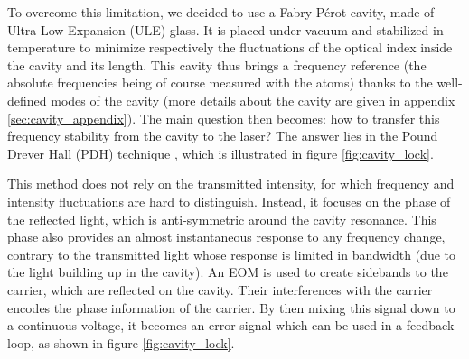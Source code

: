 \documentclass[11pt]{article}
\numberwithin{equation}{section}
\numberwithin{figure}{section}
\begin{document}
To overcome this limitation, we decided to use a Fabry-Pérot cavity, made of Ultra Low Expansion (ULE) glass. It is placed under vacuum and stabilized in temperature to minimize respectively the fluctuations of the optical index inside the cavity and its length. This cavity thus brings a frequency reference (the absolute frequencies being of course measured with the atoms) thanks to the well-defined modes of the cavity (more details about the cavity are given in appendix \ref{sec:cavity_appendix}). The main question then becomes: how to transfer this frequency stability from the cavity to the laser? The answer lies in the Pound Drever Hall (PDH) technique \citep[see for instance][]{2001_black}, which is illustrated in figure \ref{fig:cavity_lock}.  

This method does not rely on the transmitted intensity, for which frequency and intensity fluctuations are hard to distinguish. Instead, it focuses on the phase of the reflected light, which is anti-symmetric around the cavity resonance. This phase also provides an almost instantaneous response to any frequency change, contrary to the transmitted light whose response is limited in bandwidth (due to the light building up in the cavity). An EOM is used to create sidebands to the carrier, which are reflected on the cavity. Their interferences with the carrier encodes the phase information of the carrier. By then mixing this signal down to a continuous voltage, it becomes an error signal which can be used in a feedback loop, as shown in figure \ref{fig:cavity_lock}.
\end{document}
